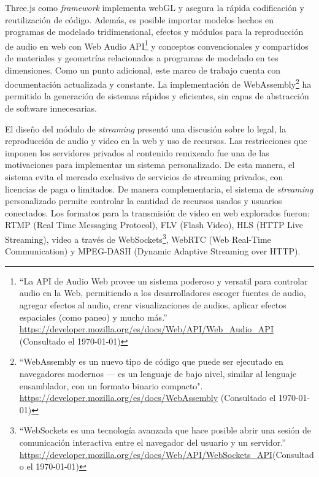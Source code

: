 Three.js como \textit{framework} implementa webGL y asegura la rápida codificación y reutilización de código. Además, es posible importar modelos hechos en programas de modelado tridimensional, efectos y módulos para la reproducción de audio en web con Web Audio API\footnote{``La API de Audio Web provee un sistema poderoso y versatil para controlar audio en la Web, permitiendo a los desarrolladores escoger fuentes de audio, agregar efectos al audio, crear visualizaciones de audios, aplicar efectos espaciales (como paneo) y mucho más.'' \url{https://developer.mozilla.org/es/docs/Web/API/Web_Audio_API} (Consultado el \today)} y conceptos convencionales y compartidos de materiales y geometrías relacionados a programas de modelado en tes dimensiones. Como un punto adicional, este marco de trabajo cuenta con documentación actualizada y constante. La implementación de WebAssembly\footnote{``WebAssembly es un nuevo tipo de código que puede ser ejecutado en navegadores modernos — es un lenguaje de bajo nivel, similar al lenguaje ensamblador, con un formato binario compacto". \url{https://developer.mozilla.org/es/docs/WebAssembly} (Consultado el \today) } ha permitido la generación de sistemas rápidos y eficientes, sin capas de abstracción de software innecesarias.

El diseño del módulo de \textit{streaming} presentó una discusión sobre lo legal, la reproducción de audio y video en la web y uso de recursos. Las restricciones que imponen los servidores privados al contenido remixeado fue una de las motivaciones para implementar un sistema personalizado. De esta manera, el sistema evita el mercado exclusivo de servicios de streaming privados, con licencias de paga o limitados. De manera complementaria, el sistema de \textit{streaming} personalizado permite controlar la cantidad de recursos usados y usuarios conectados. Los formatos para la transmisión de video en web explorados fueron: RTMP (Real Time Messaging Protocol), FLV (Flash Video), HLS (HTTP Live Streaming), video a través de WebSockets\footnote{``WebSockets es una tecnología avanzada que hace posible abrir una sesión de comunicación interactiva entre el navegador del usuario y un servidor.'' \url{https://developer.mozilla.org/es/docs/Web/API/WebSockets_API}(Consultado el \today)}, WebRTC (Web Real-Time Communication) y MPEG-DASH (Dynamic Adaptive Streaming over HTTP).

